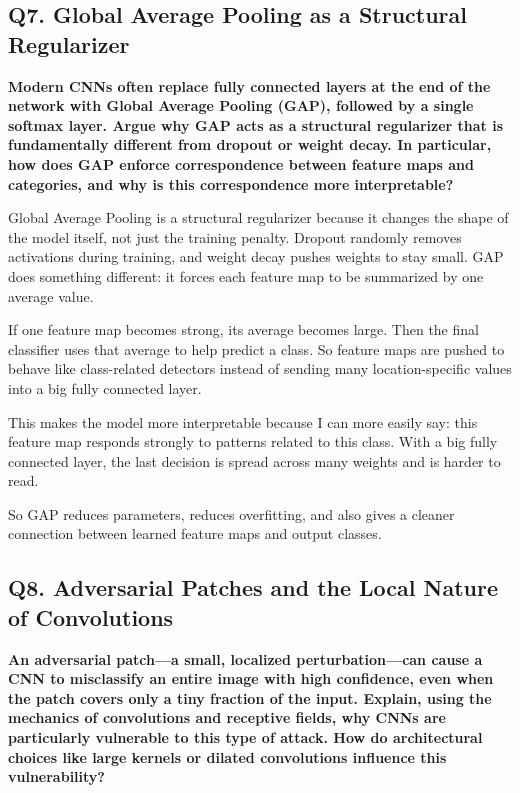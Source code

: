 \documentclass[12pt,a4paper]{article}
\newcommand{\qtext}[1]{\noindent\textbf{#1}\par}
\newcommand{\ansstart}{\begingroup\color{answerblue}}
\newcommand{\ansend}{\endgroup}
\begin{document}
\subsection{Q7. Global Average Pooling as a Structural Regularizer}

\qtext{Modern CNNs often replace fully connected layers at the end of the network with Global Average Pooling (GAP), followed by a single softmax layer. Argue why GAP acts as a structural regularizer that is fundamentally different from dropout or weight decay. In particular, how does GAP enforce correspondence between feature maps and categories, and why is this correspondence more interpretable?}

\ansstart
Global Average Pooling is a structural regularizer because it changes the shape of the model itself, not just the training penalty. Dropout randomly removes activations during training, and weight decay pushes weights to stay small. GAP does something different: it forces each feature map to be summarized by one average value.

If one feature map becomes strong, its average becomes large. Then the final classifier uses that average to help predict a class. So feature maps are pushed to behave like class-related detectors instead of sending many location-specific values into a big fully connected layer.

This makes the model more interpretable because I can more easily say: this feature map responds strongly to patterns related to this class. With a big fully connected layer, the last decision is spread across many weights and is harder to read.

So GAP reduces parameters, reduces overfitting, and also gives a cleaner connection between learned feature maps and output classes.
\ansend

\clearpage

\subsection{Q8. Adversarial Patches and the Local Nature of Convolutions}

\qtext{An adversarial patch---a small, localized perturbation---can cause a CNN to misclassify an entire image with high confidence, even when the patch covers only a tiny fraction of the input. Explain, using the mechanics of convolutions and receptive fields, why CNNs are particularly vulnerable to this type of attack. How do architectural choices like large kernels or dilated convolutions influence this vulnerability?}
\end{document}
